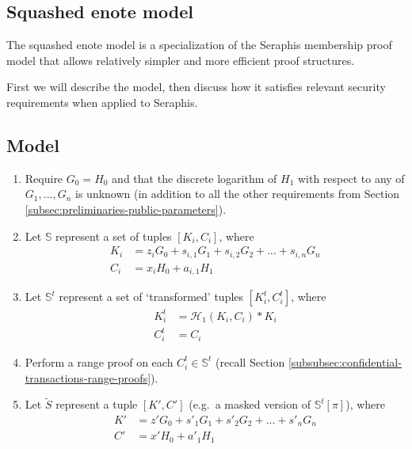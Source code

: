 \begin{appendices}
\section{Squashed enote model}
\label{appendix:squashed-enote-model}

The squashed enote model is a specialization of the Seraphis membership proof model that allows relatively simpler and more efficient proof structures.

First we will describe the model, then discuss how it satisfies relevant security requirements when applied to Seraphis.


\subsection{Model}
\label{appendix:squashed-enote-model-model}

\begin{enumerate}
    \item Require $G_0 = H_0$ and that the discrete logarithm of $H_1$ with respect to any of $G_1,...,G_n$ is unknown (in addition to all the other requirements from Section \ref{subsec:preliminaries-public-parameters}).

    \item Let $\mathbb{S}$ represent a set of tuples $[K_i, C_i]$, where\vspace{.115cm}
    \begin{align*}
        K_i &= z_i G_0 + s_{i,1} G_1 + s_{i,2} G_2 + ... + s_{i,n} G_n \\
        C_i &= x_i H_0 + a_{i,1} H_1
    \end{align*}

    \item Let $\mathbb{S}^t$ represent a set of `transformed' tuples $[K^t_i, C^t_i]$, where\vspace{.115cm}
    \begin{align*}
        K^t_i &= \mathcal{H}_1(K_i, C_i)*K_i \\
        C^t_i &= C_i
    \end{align*}

    \item Perform a range proof on each $C^t_i \in \mathbb{S}^t$ (recall Section \ref{subsubsec:confidential-transactions-range-proofs}).

    \item Let $\tilde{S}$ represent a tuple $[K', C']$ (e.g.\ a masked version of $\mathbb{S}^t[\pi]$), where\vspace{.115cm}
    \begin{align*}
        K' &= z' G_0 + s'_1 G_1 + s'_2 G_2 + ... + s'_n G_n \\
        C' &= x' H_0 + a'_1 H_1
    \end{align*}


\end{enumerate}
\end{appendices}
